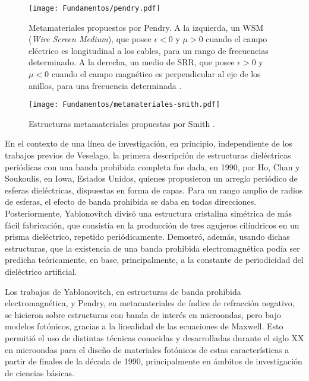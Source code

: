 \begin{figure}[htp]
	\centering
	\texttt{[image: Fundamentos/pendry.pdf]}
	\caption{Metamateriales propuestos por Pendry. A la izquierda, un WSM (\textit{Wire Screen Medium}), que posee $\epsilon<0$ y $\mu>0$ cuando el campo eléctrico es longitudinal a los cables, para un rango de frecuencias determinado. A la derecha, un medio de SRR, que posee $\epsilon>0$ y $\mu<0$ cuando el campo magnético es perpendicular al eje de los anillos, para una frecuencia determinada \cite{Caloz:ElectromagneticMetamaterials}.}
	\label{fig:Pendry}
\end{figure}

\begin{figure}[htp]
	\centering
	\texttt{[image: Fundamentos/metamateriales-smith.pdf]}
	\caption{Estructuras metamateriales propuestas por Smith \cite{Caloz:ElectromagneticMetamaterials}.}
	\label{fig:metamaterial-de-smith}
\end{figure}

En el contexto de una línea de investigación, en principio, independiente de los trabajos previos de Veselago, la primera descripción de estructuras dieléctricas periódicas con una banda prohibida completa fue dada, en 1990, por Ho, Chan y Soukoulis, en Iowa, Estados Unidos, quienes propusieron un arreglo periódico de esferas dieléctricas, dispuestas en forma de capas. Para un rango amplio de radios de esferas, el efecto de banda prohibida se daba en todas direcciones. Posteriormente, Yablonovitch divisó una estructura cristalina simétrica de más fácil fabricación, que consistía en la producción de tres agujeros cilíndricos en un prisma dieléctrico, repetido periódicamente. Demostró, además, usando dichas estructuras, que la existencia de una banda prohibida electromagnética podía ser predicha teóricamente, en base, principalmente, a la constante de periodicidad del dieléctrico artificial.

Los trabajos de Yablonovitch, en estructuras de banda prohibida electromagnética, y Pendry, en metamateriales de índice de refracción negativo, se hicieron sobre estructuras con banda de interés en microondas, pero bajo modelos fotónicos, gracias a la linealidad de las ecuaciones de Maxwell. Esto permitió el uso de distintas técnicas conocidas y desarrolladas durante el siglo XX en microondas para el diseño de materiales fotónicos de estas características a partir de finales de la década de 1990, principalmente en ámbitos de investigación de ciencias básicas.

